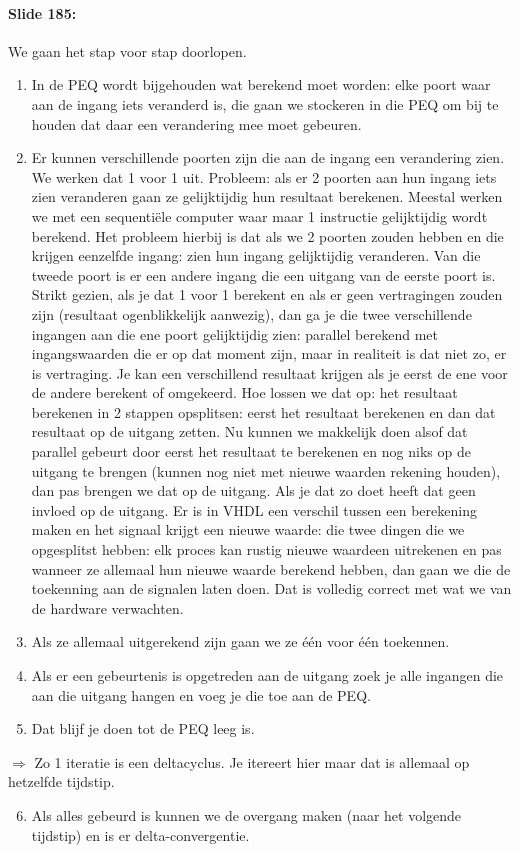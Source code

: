 \documentclass[10pt,a4paper]{book}
\begin{document}
\paragraph{Slide 185:} We gaan het stap voor stap doorlopen.
\begin{enumerate}
\item In de PEQ wordt bijgehouden wat berekend moet worden: elke poort waar aan de ingang iets veranderd is, die gaan we stockeren in die PEQ om bij te houden dat daar een verandering mee moet gebeuren.

\item Er kunnen verschillende poorten zijn die aan de ingang een verandering zien. We werken dat 1 voor 1 uit. Probleem: als er 2 poorten aan hun ingang iets zien veranderen gaan ze gelijktijdig hun resultaat berekenen. Meestal werken we met een sequenti\"ele computer waar maar 1 instructie gelijktijdig wordt berekend. Het probleem hierbij is dat als we 2 poorten zouden hebben en die krijgen eenzelfde ingang: zien hun ingang gelijktijdig veranderen. Van die tweede poort is er een andere ingang die een uitgang van de eerste poort is. Strikt gezien, als je dat 1 voor 1 berekent en als er geen vertragingen zouden zijn (resultaat ogenblikkelijk aanwezig), dan ga je die twee verschillende ingangen aan die ene poort gelijktijdig zien: parallel berekend met ingangswaarden die er op dat moment zijn, maar in realiteit is dat niet zo, er is vertraging. Je kan een verschillend resultaat krijgen als je eerst de ene voor de andere berekent of omgekeerd. Hoe lossen we dat op: het resultaat berekenen in 2 stappen opsplitsen: eerst het resultaat berekenen en dan dat resultaat op de uitgang zetten. Nu kunnen we makkelijk doen alsof dat parallel gebeurt door eerst het resultaat te berekenen en nog niks op de uitgang te brengen (kunnen nog niet met nieuwe waarden rekening houden), dan pas brengen we dat op de uitgang. Als je dat zo doet heeft dat geen invloed op de uitgang. Er is in VHDL een verschil tussen een berekening maken en het signaal krijgt een nieuwe waarde: die twee dingen die we opgesplitst hebben: elk proces kan rustig nieuwe waardeen uitrekenen en pas wanneer ze allemaal hun nieuwe waarde berekend hebben, dan gaan we die de toekenning aan de signalen laten doen. Dat is volledig correct met wat we van de hardware verwachten.
\item Als ze allemaal uitgerekend zijn gaan we ze \'e\'en voor \'e\'en toekennen.
\item Als er een gebeurtenis is opgetreden aan de uitgang zoek je alle ingangen die aan die uitgang hangen en voeg je die toe aan de PEQ.
\item Dat blijf je doen tot de PEQ leeg is.
\end{enumerate} 	
$\Rightarrow$ Zo 1 iteratie is een deltacyclus. Je itereert hier maar dat is allemaal op hetzelfde tijdstip.	
\begin{enumerate}
\setcounter{enumi}{5}
\item Als alles gebeurd is kunnen we de overgang maken (naar het volgende tijdstip) en is er delta-convergentie.
\end{enumerate}
\end{document}
